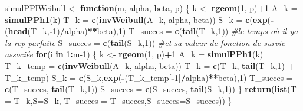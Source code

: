 \documentclass[
]{article}
\newenvironment{Shaded}{\begin{snugshade}}{\end{snugshade}}
\newcommand{\AttributeTok}[1]{\textcolor[rgb]{0.13,0.29,0.53}{#1}}
\newcommand{\CommentTok}[1]{\textcolor[rgb]{0.56,0.35,0.01}{\textit{#1}}}
\newcommand{\ControlFlowTok}[1]{\textcolor[rgb]{0.13,0.29,0.53}{\textbf{#1}}}
\newcommand{\DecValTok}[1]{\textcolor[rgb]{0.00,0.00,0.81}{#1}}
\newcommand{\FunctionTok}[1]{\textcolor[rgb]{0.13,0.29,0.53}{\textbf{#1}}}
\newcommand{\NormalTok}[1]{#1}
\newcommand{\OtherTok}[1]{\textcolor[rgb]{0.56,0.35,0.01}{#1}}
\newcommand{\SpecialCharTok}[1]{\textcolor[rgb]{0.81,0.36,0.00}{\textbf{#1}}}
\begin{document}
\begin{Shaded}
\begin{Highlighting}[]
\NormalTok{simulPPIWeibull }\OtherTok{\textless{}{-}} \ControlFlowTok{function}\NormalTok{(m, alpha, beta, p)}
\NormalTok{\{}
\NormalTok{  k }\OtherTok{\textless{}{-}} \FunctionTok{rgeom}\NormalTok{(}\DecValTok{1}\NormalTok{, p)}\SpecialCharTok{+}\DecValTok{1}
\NormalTok{  A\_k }\OtherTok{=} \FunctionTok{simulPPh1}\NormalTok{(k)}
\NormalTok{  T\_k }\OtherTok{=} \FunctionTok{c}\NormalTok{(}\FunctionTok{invWeibull}\NormalTok{(A\_k, alpha, beta))}
\NormalTok{  S\_k }\OtherTok{=} \FunctionTok{c}\NormalTok{(}\FunctionTok{exp}\NormalTok{(}\SpecialCharTok{{-}}\NormalTok{(}\FunctionTok{head}\NormalTok{(T\_k,}\SpecialCharTok{{-}}\DecValTok{1}\NormalTok{)}\SpecialCharTok{/}\NormalTok{alpha)}\SpecialCharTok{**}\NormalTok{beta),}\DecValTok{1}\NormalTok{) }
\NormalTok{  T\_succes }\OtherTok{=} \FunctionTok{c}\NormalTok{(}\FunctionTok{tail}\NormalTok{(T\_k,}\DecValTok{1}\NormalTok{)) }\CommentTok{\#le temps où il ya la rep parfaite}
\NormalTok{  S\_succes }\OtherTok{=} \FunctionTok{c}\NormalTok{(}\FunctionTok{tail}\NormalTok{(S\_k,}\DecValTok{1}\NormalTok{)) }\CommentTok{\#et sa valeur de fonction de survie associée}
  \ControlFlowTok{for}\NormalTok{(i }\ControlFlowTok{in} \DecValTok{1}\SpecialCharTok{:}\NormalTok{m}\DecValTok{{-}1}\NormalTok{)}
\NormalTok{  \{}
\NormalTok{   k }\OtherTok{\textless{}{-}} \FunctionTok{rgeom}\NormalTok{(}\DecValTok{1}\NormalTok{, p)}\SpecialCharTok{+}\DecValTok{1}
\NormalTok{   A\_k }\OtherTok{=} \FunctionTok{simulPPh1}\NormalTok{(k)}
\NormalTok{   T\_k\_temp }\OtherTok{=} \FunctionTok{c}\NormalTok{(}\FunctionTok{invWeibull}\NormalTok{(A\_k, alpha, beta))}
\NormalTok{   T\_k }\OtherTok{=} \FunctionTok{c}\NormalTok{(T\_k, }\FunctionTok{tail}\NormalTok{(T\_k,}\DecValTok{1}\NormalTok{) }\SpecialCharTok{+}\NormalTok{ T\_k\_temp)}
\NormalTok{   S\_k }\OtherTok{=} \FunctionTok{c}\NormalTok{(S\_k,}\FunctionTok{exp}\NormalTok{(}\SpecialCharTok{{-}}\NormalTok{(T\_k\_temp[}\SpecialCharTok{{-}}\DecValTok{1}\NormalTok{]}\SpecialCharTok{/}\NormalTok{alpha)}\SpecialCharTok{**}\NormalTok{beta),}\DecValTok{1}\NormalTok{)}
\NormalTok{   T\_succes }\OtherTok{=} \FunctionTok{c}\NormalTok{(T\_succes, }\FunctionTok{tail}\NormalTok{(T\_k,}\DecValTok{1}\NormalTok{))}
\NormalTok{   S\_succes }\OtherTok{=} \FunctionTok{c}\NormalTok{(S\_succes, }\FunctionTok{tail}\NormalTok{(S\_k,}\DecValTok{1}\NormalTok{))}
\NormalTok{  \}}
  \FunctionTok{return}\NormalTok{(}\FunctionTok{list}\NormalTok{(}\AttributeTok{T =}\NormalTok{ T\_k,}\AttributeTok{S=}\NormalTok{S\_k, }\AttributeTok{T\_succes =}\NormalTok{ T\_succes,}\AttributeTok{S\_succes=}\NormalTok{S\_succes))}
\NormalTok{\}}
\end{Highlighting}
\end{Shaded}
\end{document}
